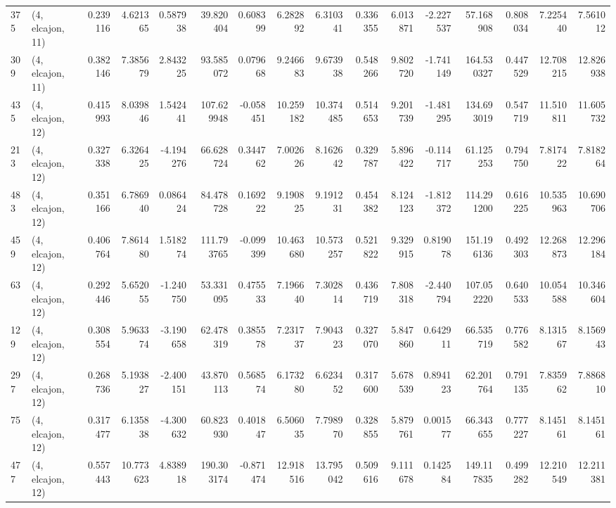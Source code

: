 \begin{tabular}{llrrrrrrrrrrrrrr}
375 &  (4, elcajon, 11) &   0.239116 &   4.621365 &   0.587938 &    39.820404 &   0.608399 &   6.282892 &   6.310341 &  0.336355 &   6.013871 &  -2.227537 &     57.168908 &    0.808034 &    7.225440 &    7.561012 \\
309 &  (4, elcajon, 11) &   0.382146 &   7.385679 &   2.843225 &    93.585072 &   0.079668 &   9.246683 &   9.673938 &  0.548266 &   9.802720 &  -1.741149 &    164.530327 &    0.447529 &   12.708215 &   12.826938 \\
435 &  (4, elcajon, 12) &   0.415993 &   8.039846 &   1.542441 &   107.629948 &  -0.058451 &  10.259182 &  10.374485 &  0.514653 &   9.201739 &  -1.481295 &    134.693019 &    0.547719 &   11.510811 &   11.605732 \\
213 &  (4, elcajon, 12) &   0.327338 &   6.326425 &  -4.194276 &    66.628724 &   0.344762 &   7.002626 &   8.162642 &  0.329787 &   5.896422 &  -0.114717 &     61.125253 &    0.794750 &    7.817422 &    7.818264 \\
483 &  (4, elcajon, 12) &   0.351166 &   6.786940 &   0.086424 &    84.478728 &   0.169222 &   9.190825 &   9.191231 &  0.454382 &   8.124123 &  -1.812372 &    114.291200 &    0.616225 &   10.535963 &   10.690706 \\
459 &  (4, elcajon, 12) &   0.406764 &   7.861480 &   1.518274 &   111.793765 &  -0.099399 &  10.463680 &  10.573257 &  0.521822 &   9.329915 &   0.819078 &    151.196136 &    0.492303 &   12.268873 &   12.296184 \\
63  &  (4, elcajon, 12) &   0.292446 &   5.652055 &  -1.240750 &    53.331095 &   0.475533 &   7.196640 &   7.302814 &  0.436719 &   7.808318 &  -2.440794 &    107.052220 &    0.640533 &   10.054588 &   10.346604 \\
129 &  (4, elcajon, 12) &   0.308554 &   5.963374 &  -3.190658 &    62.478319 &   0.385578 &   7.231737 &   7.904323 &  0.327070 &   5.847860 &   0.642911 &     66.535719 &    0.776582 &    8.131567 &    8.156943 \\
297 &  (4, elcajon, 12) &   0.268736 &   5.193827 &  -2.400151 &    43.870113 &   0.568574 &   6.173280 &   6.623452 &  0.317600 &   5.678539 &   0.894123 &     62.201764 &    0.791135 &    7.835962 &    7.886810 \\
75  &  (4, elcajon, 12) &   0.317477 &   6.135838 &  -4.300632 &    60.823930 &   0.401847 &   6.506035 &   7.798970 &  0.328855 &   5.879761 &   0.001577 &     66.343655 &    0.777227 &    8.145161 &    8.145161 \\
477 &  (4, elcajon, 12) &   0.557443 &  10.773623 &   4.838918 &   190.303174 &  -0.871474 &  12.918516 &  13.795042 &  0.509616 &   9.111678 &   0.142584 &    149.117835 &    0.499282 &   12.210549 &   12.211381 \\

\end{tabular}
